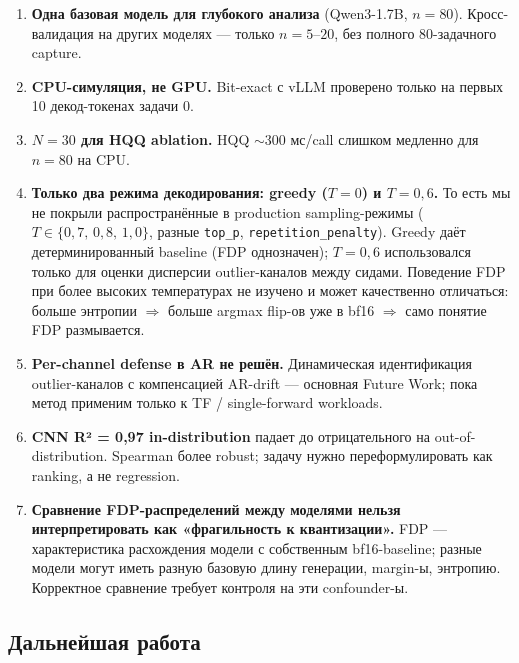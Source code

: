 \documentclass[a4paper,12pt]{article}
\begin{document}
\begin{enumerate}[label=\arabic*.,leftmargin=*]
\item \textbf{Одна базовая модель для глубокого анализа} (Qwen3-1.7B,
  $n=80$). Кросс-валидация на других моделях --- только $n = 5\text{--}20$,
  без полного 80-задачного capture.

\item \textbf{CPU-симуляция, не GPU.} Bit-exact с vLLM проверено только
  на первых 10 декод-токенах задачи 0.

\item \textbf{$N=30$ для HQQ ablation.} HQQ $\sim 300$ мс/call слишком
  медленно для $n=80$ на CPU.

\item \textbf{Только два режима декодирования: greedy ($T=0$) и
  $T=0{,}6$.} То есть мы не покрыли распространённые в production
  sampling-режимы ($T \in \{0{,}7,\,0{,}8,\,1{,}0\}$, разные
  \texttt{top\_p}, \texttt{repetition\_penalty}). Greedy даёт
  детерминированный baseline (FDP однозначен); $T=0{,}6$ использовался
  только для оценки дисперсии outlier-каналов между сидами. Поведение
  FDP при более высоких температурах не изучено и может качественно
  отличаться: больше энтропии $\Rightarrow$ больше argmax flip-ов уже
  в bf16 $\Rightarrow$ само понятие FDP размывается.

\item \textbf{Per-channel defense в AR не решён.} Динамическая
  идентификация outlier-каналов с компенсацией AR-drift --- основная
  Future Work; пока метод применим только к TF / single-forward
  workloads.

\item \textbf{CNN R² = 0,97 in-distribution} падает до отрицательного
  на out-of-distribution. Spearman более robust; задачу нужно
  переформулировать как ranking, а не regression.

\item \textbf{Сравнение FDP-распределений между моделями нельзя
  интерпретировать как «фрагильность к квантизации».} FDP ---
  характеристика расхождения модели с собственным bf16-baseline; разные
  модели могут иметь разную базовую длину генерации, margin-ы, энтропию.
  Корректное сравнение требует контроля на эти confounder-ы.
\end{enumerate}

\subsection{Дальнейшая работа}
\end{document}

